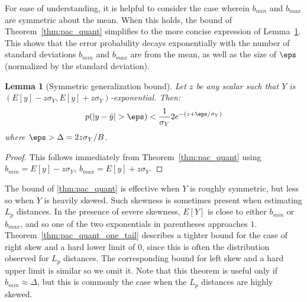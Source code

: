 \documentclass[]{article}
\newtheorem{lemma}{Lemma}[section]
\begin{document}

For ease of understanding, it is helpful to consider the case wherein $b_{min}$ and $b_{max}$ are symmetric about the mean. When this holds, the bound of Theorem~\ref{thm:pac_quant} simplifies to the more concise expression of Lemma~\ref{thm:pac_quant_z}. This shows that the error probability decays exponentially with the number of standard deviations $b_{min}$ and $b_{max}$ are from the mean, as well as the size of $\eps$ (normalized by the standard deviation).

\begin{lemma}[Symmetric generalization bound] \label{thm:pac_quant_z}
Let $z$ be any scalar such that $Y$ is $(E[y] - z \sigma_Y, E[y] + z \sigma_Y)$-exponential. Then:
\begin{align}
    p(|y - \hat{y}| > \eps) < \frac{1}{\sigma_Y} 2e^{-(z + \eps / \sigma_Y)}
\end{align}
where $\eps > \Delta = 2z\sigma_Y / B$.
\end{lemma}

\begin{proof}
This follows immediately from Theorem~\ref{thm:pac_quant} using $b_{min} = E[y] - z \sigma_Y$, $b_{max} = E[y] + z \sigma_Y$. %
\end{proof}

The bound of \ref{thm:pac_quant} is effective when $Y$ is roughly symmetric, but less so when $Y$ is heavily skewed. Such skewness is sometimes present when estimating $L_p$ distances. In the presence of severe skewness, $E[Y]$ is close to either $b_{min}$ or $b_{max}$, and so one of the two exponentials in parentheses approaches $1$. Theorem~\ref{thm:pac_quant_one_tail} describes a tighter bound for the case of right skew and a hard lower limit of $0$, since this is often the distribution observed for $L_p$ distances. The corresponding bound for left skew and a hard upper limit is similar so we omit it. Note that this theorem is useful only if $b_{min} \approx \Delta$, but this is commonly the case when the $L_p$ distances are highly skewed.
\end{document}
